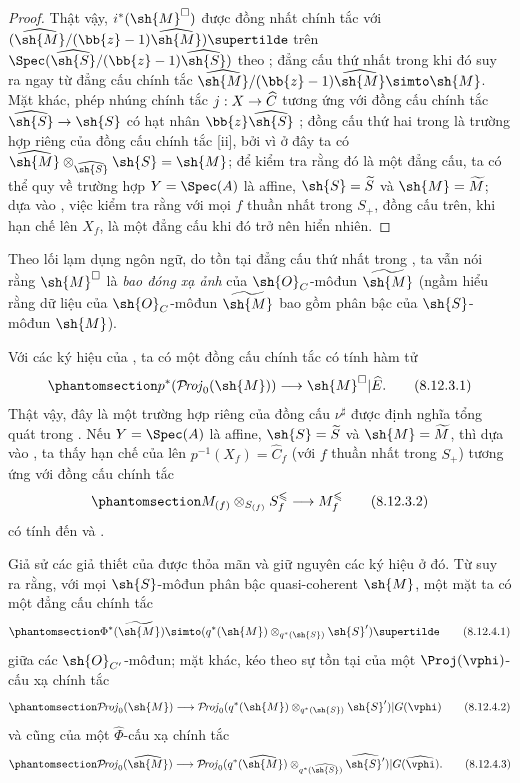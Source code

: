 \documentclass[oneside,10pt]{amsart}
\makeatletter
\renewcommand{\leq}{\leqslant}
\newcommand{\ega@arrow}[2]{\mathchoice{#1}{#2}{#2}{#2}}
\renewcommand{\to}{\ega@arrow{\longrightarrow}{\rightarrow}}
\def\shProj{\mathcal{P}\!\mathit{roj}}
\newcommand{\oldpage}[2][]{\marginnote{\normalfont\footnotesize\textbf{#1}~|~#2}\ignorespaces}
\let\EGAOriginalLabel\label
\renewcommand{\label}[1]{\phantomsection\EGAOriginalLabel{#1}}
\makeatother
\begin{document}
\begin{proof}
Thật vậy, $i^*(\sh{M}^{\square})$ được đồng nhất chính tắc với
$(\widehat{\sh{M}}/(\bb{z}-1)\widehat{\sh{M}})\supertilde$ trên
$\Spec(\widehat{\sh{S}}/(\bb{z}-1)\widehat{\sh{S}})$ theo ;
đẳng cấu thứ nhất trong  khi đó suy ra ngay  từ đẳng cấu chính tắc
$\widehat{\sh{M}}/(\bb{z}-1)\widehat{\sh{M}}\simto\sh{M}$.
Mặt khác, phép nhúng chính tắc $j:X\to\widehat{C}$ tương ứng với đồng cấu chính tắc $\widehat{\sh{S}}\to\sh{S}$ có hạt nhân $\bb{z}\widehat{\sh{S}}$ ;
đồng cấu thứ hai trong  là trường hợp riêng của đồng cấu chính tắc [ii], bởi vì ở đây ta có
$\widehat{\sh{M}}\otimes_{\widehat{\sh{S}}}\sh{S}=\sh{M}$;
để kiểm tra rằng đó là một đẳng cấu, ta có thể quy về trường hợp $Y=\Spec(A)$ là affine, $\sh{S}=\widetilde{S}$ và $\sh{M}=\widetilde{M}$;
dựa vào , việc kiểm tra rằng với mọi $f$ thuần nhất trong $S_+$, đồng cấu trên, khi hạn chế lên $X_f$, là một đẳng cấu khi đó trở nên hiển nhiên.
\end{proof}
\oldpage[II]{193}
Theo lối lạm dụng ngôn ngữ, do tồn tại đẳng cấu thứ nhất trong , ta vẫn nói rằng $\sh{M}^{\square}$ là \emph{bao đóng xạ ảnh} của $\sh{O}_C$-môđun $\widetilde{\sh{M}}$ (ngầm hiểu rằng dữ liệu của $\sh{O}_C$-môđun $\widetilde{\sh{M}}$ bao gồm phân bậc của $\sh{S}$-môđun $\sh{M}$).

\begin{env}[8.12.3]
\label{II.8.12.3}
Với các ký hiệu của , ta có một đồng cấu chính tắc có tính hàm tử
\[
\label{II.8.12.3.1}
  p^*(\shProj_0(\sh{M}))
  \to\sh{M}^{\square}|\widehat{E}.
\tag{8.12.3.1}
\]
Thật vậy, đây là một trường hợp riêng của đồng cấu $\nu^{\sharp}$ được định nghĩa tổng quát trong .
Nếu $Y=\Spec(A)$ là affine, $\sh{S}=\widetilde{S}$ và $\sh{M}=\widetilde{M}$, thì dựa vào , ta thấy hạn chế của  lên $p^{-1}(X_f)=\widehat{C}_f$ (với $f$ thuần nhất trong $S_+$) tương ứng với đồng cấu chính tắc
\[
\label{II.8.12.3.2}
  M_{(f)}\otimes_{S_{(f)}}S_f^{\leq}\to M_f^{\leq}
\tag{8.12.3.2}
\]
có tính đến  và .
\end{env}

\begin{env}[8.12.4]
\label{II.8.12.4}
Giả sử các giả thiết của  được thỏa mãn và giữ nguyên các ký hiệu ở đó.
Từ  suy ra rằng, với mọi $\sh{S}$-môđun phân bậc quasi-coherent $\sh{M}$, một mặt ta có một đẳng cấu chính tắc
\[
\label{II.8.12.4.1}
  \Phi^*(\widetilde{\sh{M}})
  \simto
  (q^*(\sh{M})\otimes_{q^*(\sh{S})}\sh{S}')\supertilde
\tag{8.12.4.1}
\]
giữa các $\sh{O}_{C'}$-môđun;
mặt khác,  kéo theo sự tồn tại của một $\Proj(\vphi)$-cấu xạ chính tắc
\[
\label{II.8.12.4.2}
  \shProj_0(\sh{M})\to
  \shProj_0(q^*(\sh{M})\otimes_{q^*(\sh{S})}\sh{S}')
  |G(\vphi)
\tag{8.12.4.2}
\]
và cũng của một $\widehat{\Phi}$-cấu xạ chính tắc
\[
\label{II.8.12.4.3}
  \shProj_0(\widehat{\sh{M}})\to
  \shProj_0(q^*(\widehat{\sh{M}})
  \otimes_{q^*(\widehat{\sh{S}})}\widehat{\sh{S}'})
  |G(\widehat{\vphi}).
\tag{8.12.4.3}
\]
\end{env}
\end{document}
